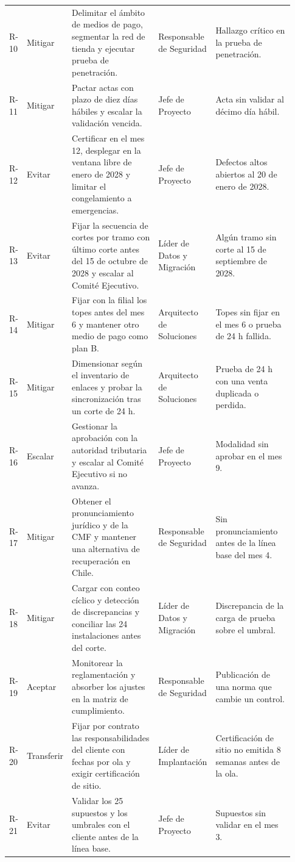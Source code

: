 \documentclass[11pt]{article}
\begin{document}
\begin{longtable}{p{0.065\linewidth}p{0.102\linewidth}p{0.316\linewidth}p{0.158\linewidth}p{0.288\linewidth}}
R-10 & Mitigar & Delimitar el ámbito de medios de pago, segmentar la red de tienda y ejecutar prueba de penetración. & Responsable de Seguridad & Hallazgo crítico en la prueba de penetración. \\
R-11 & Mitigar & Pactar actas con plazo de diez días hábiles y escalar la validación vencida. & Jefe de Proyecto & Acta sin validar al décimo día hábil. \\
R-12 & Evitar & Certificar en el mes 12, desplegar en la ventana libre de enero de 2028 y limitar el congelamiento a emergencias. & Jefe de Proyecto & Defectos altos abiertos al 20 de enero de 2028. \\
R-13 & Evitar & Fijar la secuencia de cortes por tramo con último corte antes del 15 de octubre de 2028 y escalar al Comité Ejecutivo. & Líder de Datos y Migración & Algún tramo sin corte al 15 de septiembre de 2028. \\
R-14 & Mitigar & Fijar con la filial los topes antes del mes 6 y mantener otro medio de pago como plan B. & Arquitecto de Soluciones & Topes sin fijar en el mes 6 o prueba de 24 h fallida. \\
R-15 & Mitigar & Dimensionar según el inventario de enlaces y probar la sincronización tras un corte de 24 h. & Arquitecto de Soluciones & Prueba de 24 h con una venta duplicada o perdida. \\
R-16 & Escalar & Gestionar la aprobación con la autoridad tributaria y escalar al Comité Ejecutivo si no avanza. & Jefe de Proyecto & Modalidad sin aprobar en el mes 9. \\
R-17 & Mitigar & Obtener el pronunciamiento jurídico y de la CMF y mantener una alternativa de recuperación en Chile. & Responsable de Seguridad & Sin pronunciamiento antes de la línea base del mes 4. \\
R-18 & Mitigar & Cargar con conteo cíclico y detección de discrepancias y conciliar las 24 instalaciones antes del corte. & Líder de Datos y Migración & Discrepancia de la carga de prueba sobre el umbral. \\
R-19 & Aceptar & Monitorear la reglamentación y absorber los ajustes en la matriz de cumplimiento. & Responsable de Seguridad & Publicación de una norma que cambie un control. \\
R-20 & Transferir & Fijar por contrato las responsabilidades del cliente con fechas por ola y exigir certificación de sitio. & Líder de Implantación & Certificación de sitio no emitida 8 semanas antes de la ola. \\
R-21 & Evitar & Validar los 25 supuestos y los umbrales con el cliente antes de la línea base. & Jefe de Proyecto & Supuestos sin validar en el mes 3. \\

\end{longtable}
\end{document}

